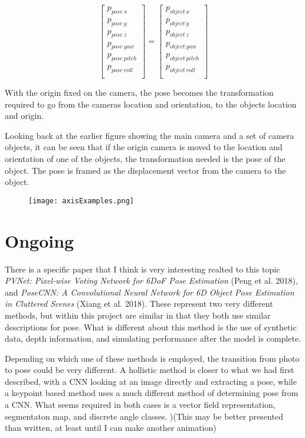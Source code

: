 \documentclass{article}
\begin{document}
\[\begin{bmatrix}
    p_{pose\ x} \\
    p_{pose\ y} \\
    p_{pose\ z} \\
    p_{pose\ yaw} \\
    p_{pose\ pitch} \\
    p_{pose\ roll} \\
\end{bmatrix}
=
\begin{bmatrix}
    p_{object\ x} \\
    p_{object\ y} \\
    p_{object\ z} \\
    p_{object\ yaw} \\
    p_{object\ pitch} \\
    p_{object\ roll} \\
\end{bmatrix}\]

With the origin fixed on the camera, the pose becomes the transformation required to go from the cameras location and orientation, to the objects location and origin.

Looking back at the earlier figure showing the main camera and a set of camera objects, it can be seen that if the origin camera is moved to the location and orientation of one of the objects, the transformation needed is the pose of the object. The pose is framed as the displacement vector from the camera to the object.

\begin{figure}[H]
    \centering
    \texttt{[image: axisExamples.png]}
   \label{fig:compute}
    \caption{}
\end{figure}


\section{Ongoing}

There is a specific paper that I think is very interesting realted to this topic \emph{PVNet: Pixel-wise Voting Network for 6DoF Pose Estimation} (Peng et al. 2018), and \emph{PoseCNN: A Convolutional Neural Network for 6D
Object Pose Estimation in Cluttered Scenes} (Xiang et al. 2018). These represent two very different methods, but within this project are similar in that they both use similar descriptions for pose. What is different about this method is the use of synthetic data, depth information, and simulating performance after the model is complete. 

Depending on which one of these methods is employed, the transition from photo to pose could be very different. A hollistic method is closer to what we had first described, with a CNN looking at an image directly and extracting a pose, while a keypoint based method uses a much different method of determining pose from a CNN. What seems required in both cases is a vector field representation, segmentaton map, and discrete angle classes. )(This may be better presented than written, at least until I can make another animation) 



%
%
\end{document}
